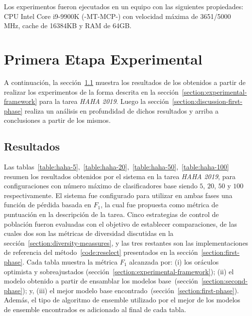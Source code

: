 Los experimentos fueron ejecutados en un equipo con las siguientes propiedades:
CPU Intel Core i9-9900K (-MT-MCP-) con velocidad máxima de 3651/5000 MHz, cache de 16384KB y RAM de 64GB.

\section{Primera Etapa Experimental}\label{section:experiments-first-phase}

A continuación, la sección~\ref{section:results-first-phase} muestra los resultados de los obtenidos a partir de realizar los experimentos de la forma descrita en la sección~\ref{section:experimental-framework} para la tarea \emph{HAHA 2019}.
Luego la sección~\ref{section:discussion-first-phase} realiza un análisis en profundidad de dichos resultados y arriba a conclusiones a partir de los mismos.

\subsection{Resultados}\label{section:results-first-phase}

Las tablas~\ref{table:haha-5},~\ref{table:haha-20},~\ref{table:haha-50},~\ref{table:haha-100} resumen los resultados obtenidos por el sistema en la tarea \emph{HAHA 2019}, para configuraciones con número máximo de clasificadores base siendo $5$, $20$, $50$ y $100$ respectivamente.
El sistema fue configurado para utilizar en ambas fases una función de pérdida basada en $F_1$, la cual fue propuesta como métrica de puntuación en la descripción de la tarea.
Cinco estrategias de control de población fueron evaluadas con el objetivo de establecer comparaciones, de las cuales dos son las métricas de diversidad discutidas en la sección~\ref{section:diversity-meassures}, y las tres restantes son las implementaciones de referencia del método~\ref{code:reselect} presentados en la sección~\ref{section:first-phase}.
Cada tabla muestra la métrica $F_1$ alcanzada por:
(i) los oráculos optimista y sobreajustados (sección~\ref{section:experimental-framework});
(ii) el modelo obtenido a partir de ensamblar los modelos base~(sección~\ref{section:second-phase}); y,
(iii) el mejor modelo base encontrado~(sección~\ref{section:first-phase}).
Además, el tipo de algoritmo de ensemble utilizado por el mejor de los modelos de ensemble encontrados es adicionado al final de cada tabla.


%

